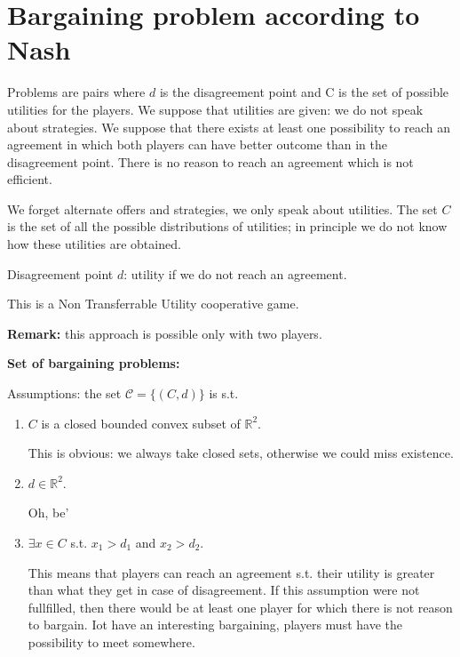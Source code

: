 
%


\section{Bargaining problem according to Nash}

\bigskip
\noindent Problems are pairs where $d$ is the disagreement point and C is the 
set of possible utilities for the players. We suppose that utilities are given: 
we do not speak about strategies. We suppose that there exists at least one 
possibility to reach an agreement in which both players can have better 
outcome than in the disagreement point. There is no reason to reach an 
agreement which is not efficient.

\noindent We forget alternate offers and strategies, we only speak about 
utilities. The set $C$ is the set of all the possible distributions of utilities; 
in principle we do not know how these utilities are obtained.

\noindent Disagreement point $d$: utility if we do not reach an agreement.

\noindent This is a Non Transferrable Utility cooperative game.

\noindent \textbf{Remark:} this approach is possible only with two players.

\bigskip
\noindent \textbf{Set of bargaining problems:}

\noindent Assumptions: the set $\mathcal{C} = \{(C,d)\}$ is s.t.
\begin{enumerate}
	\item $C$ is a closed bounded convex subset of $\mathbb{R}^2$.
	
	\noindent This is obvious: we always take closed sets, otherwise we could 
	miss existence.
	
	\item $d \in \mathbb{R}^2$. 
	
	\noindent Oh, be'
	
	\item $\exists x \in C$ s.t. $x_1 > d_1$ and $x_2 > d_2$.
	
	\noindent This means that players can reach an agreement s.t. their utility 
	is greater than what they get in case of disagreement. If this assumption 
	were not fullfilled, then there would be at least one player for which 
	there is not reason to bargain. Iot have an interesting bargaining, 
	players must have the possibility to meet somewhere.
\end{enumerate}

